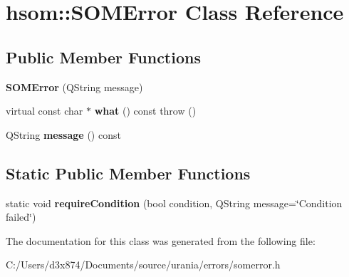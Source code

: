 \hypertarget{classhsom_1_1_s_o_m_error}{\section{hsom\-:\-:\-S\-O\-M\-Error \-Class \-Reference}
\label{classhsom_1_1_s_o_m_error}
}
\subsection*{\-Public \-Member \-Functions}
\begin{DoxyCompactItemize}
\item 
\hypertarget{classhsom_1_1_s_o_m_error_a2ccb636128e3144d2ce7af76896b8112}{{\bfseries \-S\-O\-M\-Error} (\-Q\-String message)}\label{classhsom_1_1_s_o_m_error_a2ccb636128e3144d2ce7af76896b8112}

\item 
\hypertarget{classhsom_1_1_s_o_m_error_a88ca34c7840c2494163bd7fa7d4511d3}{virtual const char $\ast$ {\bfseries what} () const   throw ()}\label{classhsom_1_1_s_o_m_error_a88ca34c7840c2494163bd7fa7d4511d3}

\item 
\hypertarget{classhsom_1_1_s_o_m_error_a0dcdc04bf99b4d999a13d8caaf68d998}{\-Q\-String {\bfseries message} () const }\label{classhsom_1_1_s_o_m_error_a0dcdc04bf99b4d999a13d8caaf68d998}

\end{DoxyCompactItemize}
\subsection*{\-Static \-Public \-Member \-Functions}
\begin{DoxyCompactItemize}
\item 
\hypertarget{classhsom_1_1_s_o_m_error_a08542dab6df0a06d60c33faf8f92055f}{static void {\bfseries require\-Condition} (bool condition, \-Q\-String message=\char`\"{}\-Condition failed\char`\"{})}\label{classhsom_1_1_s_o_m_error_a08542dab6df0a06d60c33faf8f92055f}

\end{DoxyCompactItemize}


\-The documentation for this class was generated from the following file\-:\begin{DoxyCompactItemize}
\item 
\-C\-:/\-Users/d3x874/\-Documents/source/urania/errors/somerror.\-h\end{DoxyCompactItemize}
